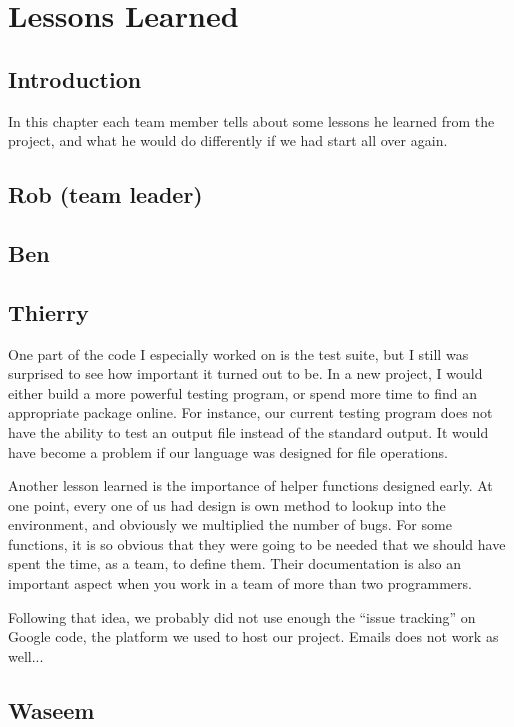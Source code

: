 
\chapter{Lessons Learned}

\section{Introduction}
In this chapter each team member tells about some lessons he learned from
the project, and what he would do differently if we had start all over
again.

\section{Rob (team leader)}

\section{Ben}

\section{Thierry}
One part of the code I especially worked on is the test suite, but I still
was surprised to see how important it turned out to be. In a new project,
I would either build a more powerful testing program, or spend more
time to find an appropriate package online. For instance, our current
testing program does not have the ability to test an output file instead
of the standard output. It would have become a problem if our language was
designed for file operations.

Another lesson learned is the importance of helper functions designed early.
At one point, every one of us had design is own method to lookup into the
environment, and obviously we multiplied the number of bugs. For some
functions, it is so obvious that they were going to be needed that we should
have spent the time, as a team, to define them. Their documentation is
also an important aspect when you work in a team of more than two programmers.

Following that idea, we probably did not use enough the ``issue tracking''
on Google code, the platform we used to host our project. Emails does not
work as well...

\section{Waseem}

